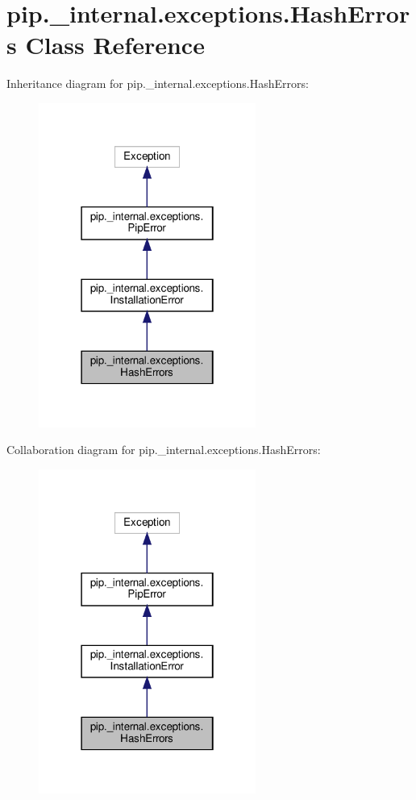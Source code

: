 \hypertarget{classpip_1_1__internal_1_1exceptions_1_1HashErrors}{}\section{pip.\+\_\+internal.\+exceptions.\+Hash\+Errors Class Reference}
\label{classpip_1_1__internal_1_1exceptions_1_1HashErrors}


Inheritance diagram for pip.\+\_\+internal.\+exceptions.\+Hash\+Errors\+:
\nopagebreak
\begin{figure}[H]
\begin{center}
\leavevmode
\includegraphics[width=202pt]{classpip_1_1__internal_1_1exceptions_1_1HashErrors__inherit__graph}
\end{center}
\end{figure}


Collaboration diagram for pip.\+\_\+internal.\+exceptions.\+Hash\+Errors\+:
\nopagebreak
\begin{figure}[H]
\begin{center}
\leavevmode
\includegraphics[width=202pt]{classpip_1_1__internal_1_1exceptions_1_1HashErrors__coll__graph}
\end{center}
\end{figure}
